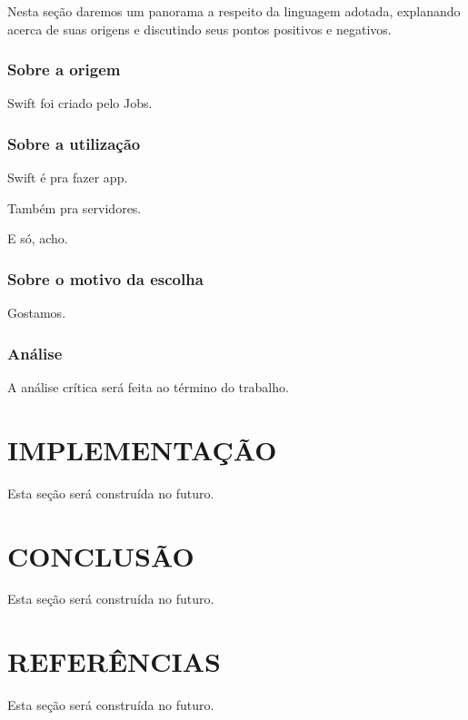 \documentclass[rel_mlp]{iiufrgs}
\begin{document}
Nesta seção daremos um panorama a respeito da linguagem adotada, explanando acerca de suas origens e discutindo seus pontos positivos e negativos.

\subsection{Sobre a origem}

Swift foi criado pelo Jobs.

\subsection{Sobre a utilização}

Swift é pra fazer app.

Também pra servidores.

E só, acho.

\subsection{Sobre o motivo da escolha}

Gostamos.

\subsection{Análise}

A análise crítica será feita ao término do trabalho.


%
\chapter{IMPLEMENTAÇÃO}

Esta seção será construída no futuro.


%
\chapter{CONCLUSÃO}

Esta seção será construída no futuro.


%
\chapter{REFERÊNCIAS}

Esta seção será construída no futuro.
\end{document}
